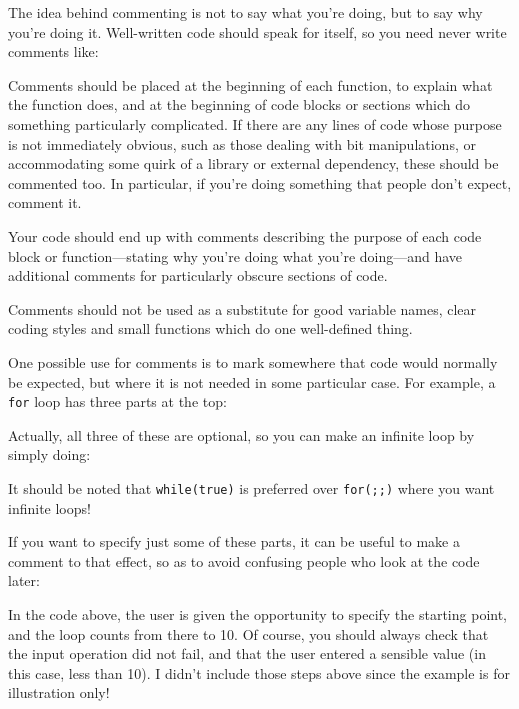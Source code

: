 \documentclass[a4paper]{scrartcl}
\begin{document}
The idea behind commenting is not to say what you're doing, but to say why you're doing it. Well-written code should speak for itself, so you need never write comments like:



Comments should be placed at the beginning of each function, to explain what the function does, and at the beginning of code blocks or sections which do something particularly complicated. If there are any lines of code whose purpose is not immediately obvious, such as those dealing with bit manipulations, or accommodating some quirk of a library or external dependency, these should be commented too. In particular, if you're doing something that people don't expect, comment it.

Your code should end up with comments describing the purpose of each code block or function---stating why you're doing what you're doing---and have additional comments for particularly obscure sections of code.

Comments should not be used as a substitute for good variable names, clear coding styles and small functions which do one well-defined thing.

One possible use for comments is to mark somewhere that code would normally be expected, but where it is not needed in some particular case. For example, a \texttt{for} loop has three parts at the top:



Actually, all three of these are optional, so you can make an infinite loop by simply doing:



It should be noted that \texttt{while(true)} is preferred over \texttt{for(;;)} where you want infinite loops!

If you want to specify just some of these parts, it can be useful to make a comment to that effect, so as to avoid confusing people who look at the code later:



In the code above, the user is given the opportunity to specify the starting point, and the loop counts from there to 10. Of course, you should always check that the input operation did not fail, and that the user entered a sensible value (in this case, less than 10). I didn't include those steps above since the example is for illustration only!
\end{document}
